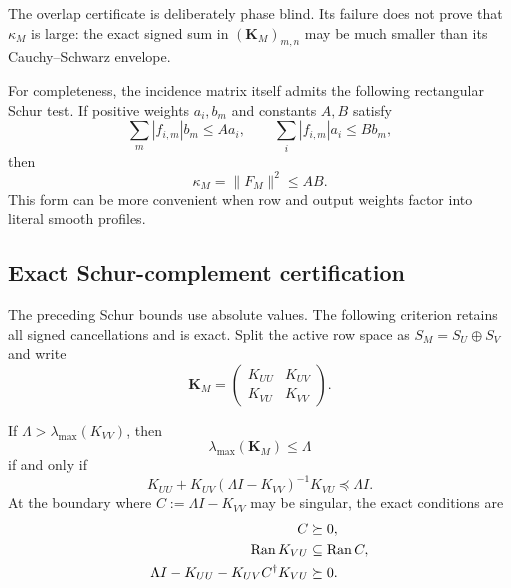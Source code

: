 The overlap certificate is deliberately phase blind.  Its failure does
not prove that \(\kappa_M\) is large: the exact signed sum in
\((\mathbf K_M)_{m,n}\) may be much smaller than its Cauchy--Schwarz
envelope.

For completeness, the incidence matrix itself admits the following
rectangular Schur test.  If positive weights \(a_i,b_m\) and constants
\(A,B\) satisfy
\begin{equation}
 \sum_m|f_{i,m}|b_m\le A a_i,
 \qquad
 \sum_i|f_{i,m}|a_i\le B b_m,
 \label{eq:tpc61-rectangular-schur-hypothesis}
\end{equation}
then
\begin{equation}
 \boxed{\kappa_M=\|F_M\|^2\le AB.}
 \label{eq:tpc61-rectangular-schur}
\end{equation}
This form can be more convenient when row and output weights factor into
literal smooth profiles.

\subsection{Exact Schur-complement certification}

The preceding Schur bounds use absolute values.  The following criterion
retains all signed cancellations and is exact.  Split the active row space
as \(S_M=S_U\oplus S_V\) and write
\begin{equation}
 \mathbf K_M=
 \begin{pmatrix}
  K_{UU}&K_{UV}\\
  K_{VU}&K_{VV}
 \end{pmatrix}.
 \label{eq:tpc61-blocked-collision-gram}
\end{equation}

\begin{proposition}
\label{prop:tpc61-exact-schur-complement}
If \(\Lambda>\lambda_{\max}(K_{VV})\), then
\begin{equation}
 \lambda_{\max}(\mathbf K_M)\le\Lambda
 \label{eq:tpc61-lambda-upper-target}
\end{equation}
if and only if
\begin{equation}
 \boxed{
 K_{UU}
 +K_{UV}(\Lambda I-K_{VV})^{-1}K_{VU}
 \preceq\Lambda I.}
 \label{eq:tpc61-strict-schur-certificate}
\end{equation}
At the boundary where
\(C:=\Lambda I-K_{VV}\) may be singular, the exact conditions are
\begin{align}
 C&\succeq0,
 \label{eq:tpc61-singular-schur-one}\\
 \operatorname{Ran} K_{VU}&\subseteq\operatorname{Ran} C,
 \label{eq:tpc61-singular-schur-two}\\
 \Lambda I-K_{UU}-K_{UV}C^\dagger K_{VU}&\succeq0.
 \label{eq:tpc61-singular-schur-three}
\end{align}
\end{proposition}

